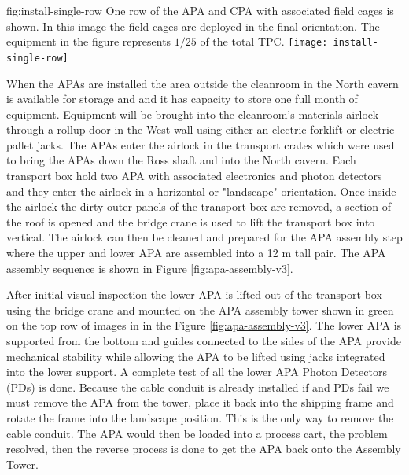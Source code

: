 \begin{dunefigure}{fig:install-single-row}
{One row of the APA and CPA with associated field cages is shown. In this  image the field cages are deployed in the final orientation. The equipment in the figure represents $1/25$ of the total TPC.}
 \texttt{[image: install-single-row]}
\end{dunefigure}

When the APAs are installed the area outside the cleanroom in the North cavern is available for storage and and it has capacity to store one full month of equipment. 
Equipment will be brought into the cleanroom's materials airlock through a rollup door in the West wall using either an electric forklift or electric pallet jacks.  
The APAs enter the airlock in the transport crates which were used to bring the APAs down the Ross shaft and into the North cavern. 
Each transport box hold two APA with associated electronics and photon detectors and they enter the airlock in a horizontal or "landscape" orientation. 
Once inside the airlock the dirty outer panels of the transport box are removed, a section of the roof is opened and the bridge crane is used to lift the transport box into vertical. 
The airlock can then be cleaned and prepared for the APA assembly step where the upper and lower APA are assembled into a 12 \si{m} tall pair.
The APA assembly sequence is shown in Figure \ref{fig:apa-assembly-v3}.

After initial visual inspection the lower APA is lifted out of the transport box 
using the bridge crane and mounted on the APA assembly tower shown in green on the top row of images in in the Figure \ref{fig:apa-assembly-v3}. 
The  lower APA is supported from the bottom and guides connected to the sides of the APA provide mechanical stability while allowing the APA to be lifted using jacks integrated into the lower support. A complete test of all the lower APA Photon Detectors (PDs) is done.  Because the cable conduit is already installed if and PDs fail we must remove the APA from the tower, place it back into the shipping frame and rotate the frame into the landscape position.  This is the only way to remove the cable conduit. The APA would then be loaded into a process cart, the problem resolved, then the reverse process is done to get the APA back onto the Assembly Tower. 

